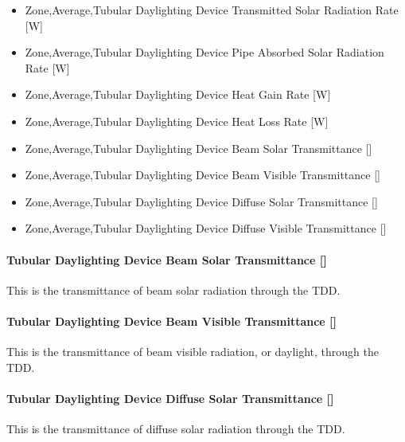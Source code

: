 \begin{itemize}
\item
  Zone,Average,Tubular Daylighting Device Transmitted Solar Radiation Rate {[}W{]}
\item
  Zone,Average,Tubular Daylighting Device Pipe Absorbed Solar Radiation Rate {[}W{]}
\item
  Zone,Average,Tubular Daylighting Device Heat Gain Rate {[}W{]}
\item
  Zone,Average,Tubular Daylighting Device Heat Loss Rate {[}W{]}
\item
  Zone,Average,Tubular Daylighting Device Beam Solar Transmittance {[]}
\item
  Zone,Average,Tubular Daylighting Device Beam Visible Transmittance {[]}
\item
  Zone,Average,Tubular Daylighting Device Diffuse Solar Transmittance {[]}
\item
  Zone,Average,Tubular Daylighting Device Diffuse Visible Transmittance {[]}
\end{itemize}

\paragraph{\texorpdfstring{Tubular Daylighting Device Beam Solar Transmittance {[]}}{Tubular Daylighting Device Beam Solar Transmittance }}\label{tubular-daylighting-device-beam-solar-transmittance}

This is the transmittance of beam solar radiation through the TDD.

\paragraph{\texorpdfstring{Tubular Daylighting Device Beam Visible Transmittance {[]}}{Tubular Daylighting Device Beam Visible Transmittance }}\label{tubular-daylighting-device-beam-visible-transmittance}

This is the transmittance of beam visible radiation, or daylight, through the TDD.

\paragraph{\texorpdfstring{Tubular Daylighting Device Diffuse Solar Transmittance {[]}}{Tubular Daylighting Device Diffuse Solar Transmittance }}\label{tubular-daylighting-device-diffuse-solar-transmittance}

This is the transmittance of diffuse solar radiation through the TDD.

